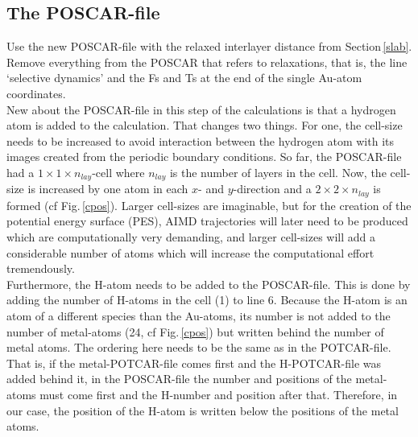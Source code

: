 \documentclass[twoside, 11pt, titlepage, captions=nooneline, a4paper, headsepline]{scrbook}%
\newcommand{\9}{\mathrm}
\newcommand{\0}{\,\mathrm}
\begin{document}
\subsection{The POSCAR-file}
Use the new POSCAR-file with the relaxed interlayer distance from Section\,\ref{slab}. Remove everything from the POSCAR that refers to relaxations, that is, the line `selective dynamics' and the Fs and Ts at the end of the single Au-atom coordinates.\\
New about the POSCAR-file in this step of the calculations is that a hydrogen atom is added to the calculation. That changes two things. For one, the cell-size needs to be increased to avoid interaction between the hydrogen atom with its images created from the periodic boundary conditions. So far, the POSCAR-file had a $1\times1\times n_{lay}$-cell where $n_{lay}$ is the number of layers in the cell. Now, the cell-size is increased by one atom in each $x$- and $y$-direction and a $2\times2\times n_{lay}$ is formed (cf Fig.\,\ref{cpos}). Larger cell-sizes are imaginable, but for the creation of the potential energy surface (PES), AIMD trajectories will later need to be produced which are computationally very demanding, and larger cell-sizes will add a considerable number of atoms which will increase the computational effort tremendously.\\
Furthermore, the H-atom needs to be added to the POSCAR-file. This is done by adding the number of H-atoms in the cell (1) to line 6. Because the H-atom is an atom of a different species than the Au-atoms, its number is not added to the number of metal-atoms (24, cf Fig.\,\ref{cpos}) but written behind the number of metal atoms. The ordering here needs to be the same as in the POTCAR-file. That is, if the metal-POTCAR-file comes first and the H-POTCAR-file was added behind it, in the POSCAR-file the number and positions of the metal-atoms must come first and the H-number and position after that. Therefore, in our case, the position of the H-atom is written below the positions of the metal atoms.
\end{document}
